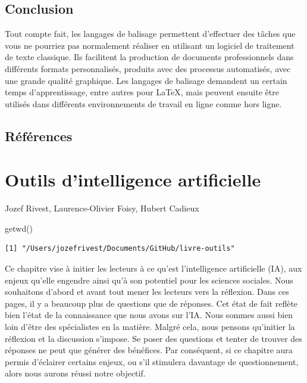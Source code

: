 \documentclass[
  letterpaper,
]{scrbook}
\newenvironment{Shaded}{\begin{snugshade}}{\end{snugshade}}
\newcommand{\FunctionTok}[1]{\textcolor[rgb]{0.28,0.35,0.67}{#1}}
\newcommand{\NormalTok}[1]{\textcolor[rgb]{0.00,0.23,0.31}{#1}}
\begin{document}
\hypertarget{conclusion-4}{%
\section{Conclusion}\label{conclusion-4}}

Tout compte fait, les langages de balisage permettent d'effectuer des
tâches que vous ne pourriez pas normalement réaliser en utilisant un
logiciel de traitement de texte classique. Ils facilitent la production
de documents professionnels dans différents formats personnalisés,
produits avec des processus automatisés, avec une grande qualité
graphique. Les langages de balisage demandent un certain temps
d'apprentissage, entre autres pour \LaTeX, mais peuvent ensuite être
utilisés dans différents environnements de travail en ligne comme hors
ligne.

\hypertarget{ruxe9fuxe9rences-1}{%
\section{Références}\label{ruxe9fuxe9rences-1}}


\hypertarget{outils-dintelligence-artificielle}{%
\chapter{Outils d'intelligence
artificielle}\label{outils-dintelligence-artificielle}}

\begin{center}

Jozef Rivest, Laurence-Olivier Foisy, Hubert Cadieux

\end{center}

\begin{Shaded}
\begin{Highlighting}[]
\FunctionTok{getwd}\NormalTok{()}
\end{Highlighting}
\end{Shaded}

\begin{verbatim}
[1] "/Users/jozefrivest/Documents/GitHub/livre-outils"
\end{verbatim}

Ce chapitre vise à initier les lecteurs à ce qu'est l'intelligence
artificielle (IA), aux enjeux qu'elle engendre ainsi qu'à son potentiel
pour les sciences sociales. Nous souhaitons d'abord et avant tout mener
les lecteurs vers la réflexion. Dans ces pages, il y a beaucoup plus de
questions que de réponses. Cet état de fait reflète bien l'état de la
connaissance que nous avons sur l'IA. Nous sommes aussi bien loin d'être
des spécialistes en la matière. Malgré cela, nous pensons qu'initier la
réflexion et la discussion s'impose. Se poser des questions et tenter de
trouver des réponses ne peut que générer des bénéfices. Par conséquent,
si ce chapitre aura permis d'éclairer certains enjeux, ou s'il stimulera
davantage de questionnement, alors nous aurons réussi notre objectif.
\end{document}
